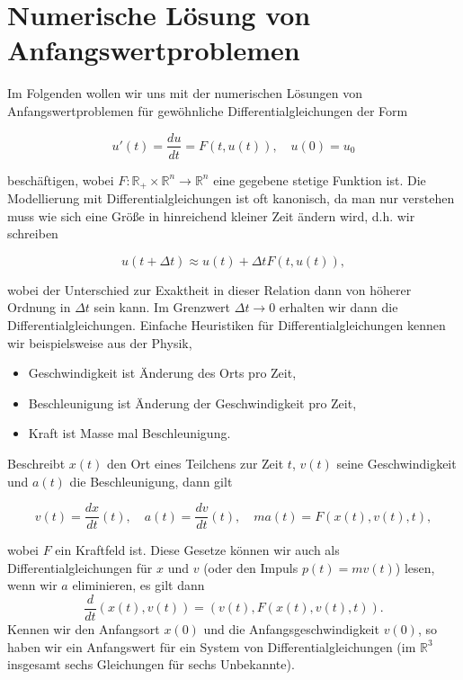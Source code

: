 \chapter{Numerische Lösung von Anfangswertproblemen} 

Im Folgenden wollen wir uns mit der numerischen Lösungen von Anfangswertproblemen für gewöhnliche Differentialgleichungen der Form

\begin{equation}
u'(t) = \frac{du}{dt} = F(t,u(t)), \quad u(0) = u_0 \label{eq:awp}
\end{equation}

beschäftigen, wobei $F: \mathbb{R}_+ \times \mathbb{R}^n \rightarrow \mathbb{R}^n$ eine gegebene stetige Funktion ist. Die Modellierung mit Differentialgleichungen ist oft kanonisch, da man nur verstehen muss wie sich eine Größe in hinreichend kleiner Zeit ändern wird, d.h. wir schreiben

\begin{equation*}
u(t+\Delta t)  \approx u(t) + \Delta t F(t,u(t)) ,
\end{equation*}

wobei der Unterschied zur Exaktheit in dieser Relation dann von höherer Ordnung in $\Delta t$ sein kann. Im Grenzwert $\Delta t \rightarrow 0$ erhalten wir dann die Differentialgleichungen.  Einfache Heuristiken für Differentialgleichungen kennen wir beispielsweise aus der Physik,

\begin{itemize}
\item Geschwindigkeit ist Änderung des Orts pro Zeit,
\item Beschleunigung ist Änderung der Geschwindigkeit pro Zeit,
\item Kraft ist Masse mal Beschleunigung.
\end{itemize}

Beschreibt $x(t)$ den Ort eines Teilchens zur Zeit $t$, $v(t)$ seine Geschwindigkeit und $a(t)$ die Beschleunigung, dann gilt

\begin{equation*}
v(t) = \frac{dx}{dt}(t), \quad a(t) =  \frac{dv}{dt}(t), \quad m a(t) = F(x(t),v(t),t),
\end{equation*}

wobei $F$ ein Kraftfeld ist. Diese Gesetze können wir auch als Differentialgleichungen für $x$ und $v$ (oder den Impuls $p(t)=m v(t)$) lesen, wenn wir $a$ eliminieren, es gilt dann
$$ \frac{d}{dt} (x(t),v(t)) = (v(t), F(x(t),v(t),t)). $$
Kennen wir den Anfangsort $x(0)$ und die Anfangsgeschwindigkeit $v(0)$, so haben wir ein Anfangswert für ein System von Differentialgleichungen (im $\mathbb{R}^3$ insgesamt sechs Gleichungen für sechs Unbekannte). 

